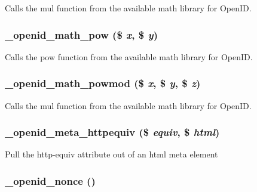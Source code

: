 \label{openid_8inc_a4081e0bfb8cf14326b426c89e4293952}
Calls the mul function from the available math library for OpenID. \hypertarget{openid_8inc_ad4c65d1b75dba1aca1ad0ea32bcd4d1c}{
\subsubsection[{\_\-openid\_\-math\_\-pow}]{\setlength{\rightskip}{0pt plus 5cm}\_\-openid\_\-math\_\-pow (\$ {\em x}, \/  \$ {\em y})}}
\label{openid_8inc_ad4c65d1b75dba1aca1ad0ea32bcd4d1c}
Calls the pow function from the available math library for OpenID. \hypertarget{openid_8inc_a45d8a622c010b733b6e3b5365b02c2f4}{
\subsubsection[{\_\-openid\_\-math\_\-powmod}]{\setlength{\rightskip}{0pt plus 5cm}\_\-openid\_\-math\_\-powmod (\$ {\em x}, \/  \$ {\em y}, \/  \$ {\em z})}}
\label{openid_8inc_a45d8a622c010b733b6e3b5365b02c2f4}
Calls the mul function from the available math library for OpenID. \hypertarget{openid_8inc_acbf79310505895f32ef771f12addd3bc}{
\subsubsection[{\_\-openid\_\-meta\_\-httpequiv}]{\setlength{\rightskip}{0pt plus 5cm}\_\-openid\_\-meta\_\-httpequiv (\$ {\em equiv}, \/  \$ {\em html})}}
\label{openid_8inc_acbf79310505895f32ef771f12addd3bc}
Pull the http-\/equiv attribute out of an html meta element \hypertarget{openid_8inc_a7f413b6dbcae0aab572b51b57f08b076}{
\subsubsection[{\_\-openid\_\-nonce}]{\setlength{\rightskip}{0pt plus 5cm}\_\-openid\_\-nonce ()}}
